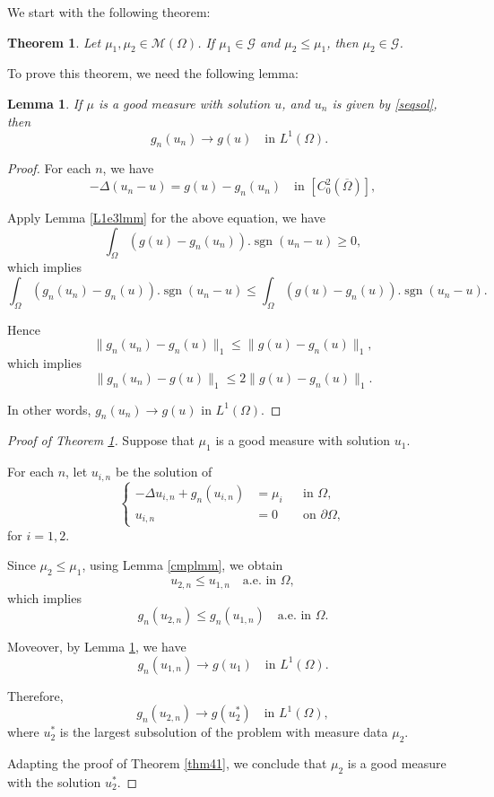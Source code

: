 \documentclass[a4paper, 11pt]{report}
\newtheorem{thm}{Theorem}[chapter]
\newtheorem{lmm}{Lemma}[chapter]
\theoremstyle{definition}\newtheorem*{rmk}{Remark}
\DeclareMathOperator{\sgn}{sgn}
\begin{document}
We start with the following theorem:

\begin{thm}\label{gcmpthm}
Let $\mu_1, \mu_2 \in \mathcal{M}(\Omega)$. If  $\mu_1\in \mathcal{G}$ and $\mu_2 \le \mu_1$, then $\mu_2 \in \mathcal{G} $.
\end{thm}

To prove this theorem, we need the following lemma:

\begin{lmm}\label{23lmm}
If $\mu$ is a good measure with solution $u$, and $u_n$ is given by \eqref{seqsol}, then
\[
\quad g_n(u_n) \to g(u) \quad\text{in }L^1(\Omega).
\]
\end{lmm}

\begin{proof}
\mbox{}

For each $n$, we have
\[
-\Delta(u_n -u) = g(u) - g_n(u_n) \quad\text{in }[C^2_0(\overline{\Omega})],
\]

Apply Lemma \ref{L1e3lmm} for the above equation, we have
\[
\int_{\Omega} (g(u)-g_n(u_n)).\sgn(u_n-u) \ge 0,
\]
which implies
\[
\int_{\Omega} (g_n(u_n)-g_n(u)).\sgn(u_n-u) \le \int_{\Omega}(g(u)-g_n(u)).\sgn(u_n -u).
\]

Hence
\[
\| g_n(u_n) - g_n(u) \|_1 \le \| g(u)-g_n(u)\|_1,
\]
which implies
\[
\| g_n(u_n) - g(u) \|_1 \le 2\| g(u)-g_n(u)\|_1.
\]

In other words, $g_n(u_n) \to g(u)$ in $L^1(\Omega)$.
\end{proof}

\begin{proof}[Proof of Theorem \ref{gcmpthm}]
Suppose that $\mu_1$ is a good measure with solution $u_1$.

For each $n$, let $u_{i,n}$ be the solution of
\[
\left\{
\begin{aligned}
-\Delta u_{i,n} + g_n(u_{i,n}) & = \mu_i && \text{in } \Omega , \\
u_{i,n} & = 0 && \text{on } \partial \Omega,
\end{aligned}
\right.
\]
for $i = 1,2$.

Since $\mu_2 \leq \mu_1$, using Lemma \ref{cmplmm}, we obtain
\[
u_{2,n} \le u_{1,n} \quad\text{a.e.\ in }\Omega,
\]
which implies
\[
g_n(u_{2,n})\le g_n(u_{1,n})\quad\text{a.e.\ in }\Omega.
\]

Moveover, by Lemma \ref{23lmm}, we have
\[
g_n(u_{1,n}) \to g(u_1)\quad\text{in } L^1(\Omega).
\]

Therefore,
\[
g_n(u_{2,n}) \to g(u_2^*) \quad\text{in }L^1(\Omega),
\]
where $u_2^*$ is the largest subsolution of the problem with measure data $\mu_2$.

Adapting the proof of Theorem \ref{thm41}, we conclude that $\mu_2$ is a good measure with the solution $u_2^*$.
\end{proof}
\end{document}
